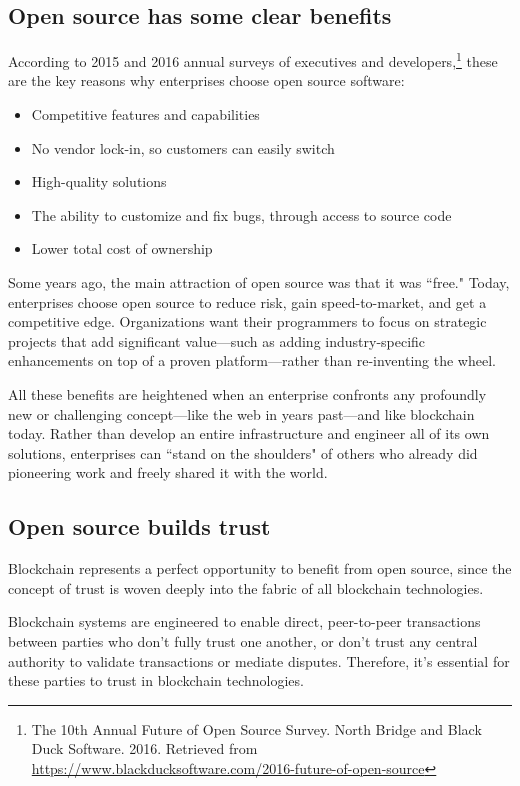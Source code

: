\subsection{Open source has some clear benefits}
According to 2015 and 2016 annual surveys of executives and developers,\footnote{ The 10th Annual Future of Open Source Survey. North Bridge and Black Duck Software. 2016. Retrieved from \url{https://www.blackducksoftware.com/2016-future-of-open-source}} these are the key reasons why enterprises choose open source software:  
\begin{itemize}
\item Competitive features and capabilities
\item No vendor lock-in, so customers can easily switch
\item High-quality solutions
\item The ability to customize and fix bugs, through access to source code
\item Lower total cost of ownership
\end{itemize}

Some years ago, the main attraction of open source was that it was ``free." 
Today, enterprises choose open source to reduce risk, gain speed-to-market, and get a competitive edge. 
Organizations want their programmers to focus on strategic projects that add significant value---such as adding industry-specific enhancements on top of a proven platform---rather than re-inventing the wheel. 

All these benefits are heightened when an enterprise confronts any profoundly new or challenging concept---like the web in years past---and like blockchain today. 
Rather than develop an entire infrastructure and engineer all of its own solutions, enterprises can ``stand on the shoulders" of others who  already did pioneering work and freely shared it with the world. 

\subsection{Open source builds trust}
Blockchain represents a perfect opportunity to benefit from open source, since the concept of trust is woven deeply into the fabric of all blockchain technologies. 

Blockchain systems are engineered to enable direct, peer-to-peer transactions between parties who don't fully trust one another, or don't trust any central authority to validate transactions or mediate disputes. 
Therefore, it's essential for these parties to trust in blockchain technologies. 

